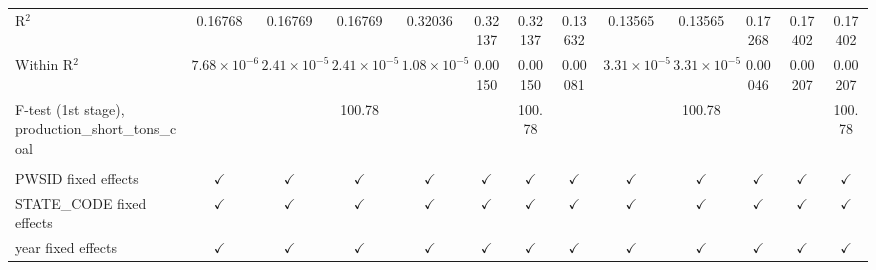 \begin{table}[htbp]
\begin{adjustbox}{width = \textwidth, center}
\begin{tabular}{lcccccccccccc}
         R$^2$                                                & 0.16768                 & 0.16769               & 0.16769               & 0.32036                & 0.32137        & 0.32137               & 0.13632                & 0.13565               & 0.13565               & 0.17268               & 0.17402         & 0.17402\\  
         Within R$^2$                                         & $7.68\times 10^{-6}$    & $2.41\times 10^{-5}$  & $2.41\times 10^{-5}$  & $1.08\times 10^{-5}$   & 0.00150        & 0.00150               & 0.00081                & $3.31\times 10^{-5}$  & $3.31\times 10^{-5}$  & 0.00046               & 0.00207         & 0.00207\\  
         F-test (1st stage), production\_short\_tons\_coal    &                         &                       & 100.78                &                        &                & 100.78                &                        &                       & 100.78                &                       &                 & 100.78\\  
          \\
         PWSID fixed effects                                  & $\checkmark$            & $\checkmark$          & $\checkmark$          & $\checkmark$           & $\checkmark$   & $\checkmark$          & $\checkmark$           & $\checkmark$          & $\checkmark$          & $\checkmark$          & $\checkmark$    & $\checkmark$\\   
         STATE\_CODE fixed effects                            & $\checkmark$            & $\checkmark$          & $\checkmark$          & $\checkmark$           & $\checkmark$   & $\checkmark$          & $\checkmark$           & $\checkmark$          & $\checkmark$          & $\checkmark$          & $\checkmark$    & $\checkmark$\\   
         year fixed effects                                   & $\checkmark$            & $\checkmark$          & $\checkmark$          & $\checkmark$           & $\checkmark$   & $\checkmark$          & $\checkmark$           & $\checkmark$          & $\checkmark$          & $\checkmark$          & $\checkmark$    & $\checkmark$\\   
         \bottomrule
      \end{tabular}
   \end{adjustbox}
\end{table}


